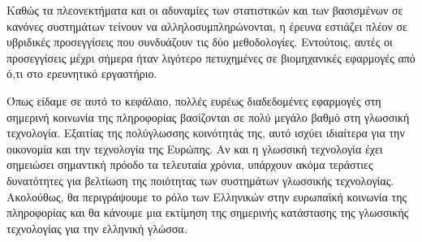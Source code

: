 \begin{multicols}{2}
Καθώς τα πλεονεκτήματα και οι αδυναμίες των στατιστικών και των βασισμένων σε κανόνες συστημάτων τείνουν να αλληλοσυμπληρώνονται, η  έρευνα εστιάζει πλέον σε υβριδικές προσεγγίσεις που συνδυάζουν τις δύο μεθοδολογίες. Εντούτοις, αυτές οι προσεγγίσεις μέχρι σήμερα ήταν λιγότερο πετυχημένες σε βιομηχανικές εφαρμογές από ό,τι στο ερευνητικό εργαστήριο. 

Όπως είδαμε σε αυτό το κεφάλαιο, πολλές ευρέως διαδεδομένες εφαρμογές στη σημερινή κοινωνία της πληροφορίας βασίζονται σε πολύ μεγάλο βαθμό στη γλωσσική τεχνολογία. Εξαιτίας της πολύγλωσσης κοινότητάς της, αυτό ισχύει ιδιαίτερα για την οικονομία και την τεχνολογία της Ευρώπης. Αν και η γλωσσική τεχνολογία έχει σημειώσει σημαντική πρόοδο τα τελευταία χρόνια, υπάρχουν ακόμα τεράστιες δυνατότητες για βελτίωση της ποιότητας των συστημάτων γλωσσικής τεχνολογίας. Ακολούθως, θα περιγράψουμε το ρόλο των Ελληνικών στην ευρωπαϊκή κοινωνία της πληροφορίας και θα κάνουμε μια εκτίμηση της σημερινής κατάστασης της γλωσσικής τεχνολογίας για την ελληνική γλώσσα.
\end{multicols}

\clearpage


